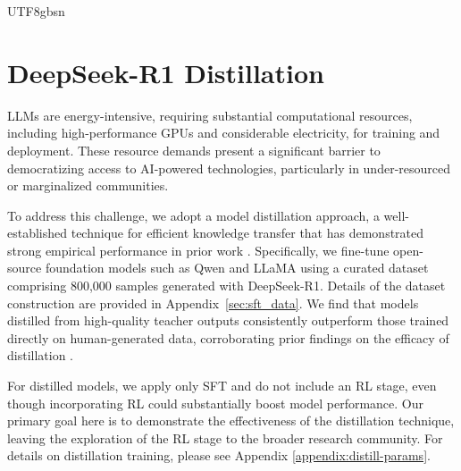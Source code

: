 \documentclass[11pt, a4paper, logo, copyright, nonumbering]{deepseek}
\newcommand{\dsri}{DeepSeek-R1}
\begin{document}
\begin{CJK*}{UTF8}{gbsn}
\section{\dsri{} Distillation}\label{sec:distillation}
LLMs are energy-intensive, requiring substantial computational resources, including high-performance GPUs and considerable electricity, for training and deployment. These resource demands present a significant barrier to democratizing access to AI-powered technologies, particularly in under-resourced or marginalized communities.

To address this challenge, we adopt a model distillation approach, a well-established technique for efficient knowledge transfer that has demonstrated strong empirical performance in prior work \citep{busbridge2025distillation, DBLP:journals/corr/HintonVD15}.
Specifically, we fine-tune open-source foundation models such as Qwen \citep{qwen2_5} and LLaMA \citep{touvron2023llama, llama3_1_405b} using a curated dataset comprising 800,000 samples generated with DeepSeek-R1. Details of the dataset construction are provided in Appendix~\ref{sec:sft_data}. We find that models distilled from high-quality teacher outputs consistently outperform those trained directly on human-generated data, corroborating prior findings on the efficacy of distillation \citep{busbridge2025distillation}.

For distilled models, we apply only SFT and do not include an RL stage, even though incorporating RL could substantially boost model performance. Our primary goal here is to demonstrate the effectiveness of the distillation technique, leaving the exploration of the RL stage to the broader research community. For details on distillation training, please see Appendix \ref{appendix:distill-params}.


\end{CJK*}
\end{document}
